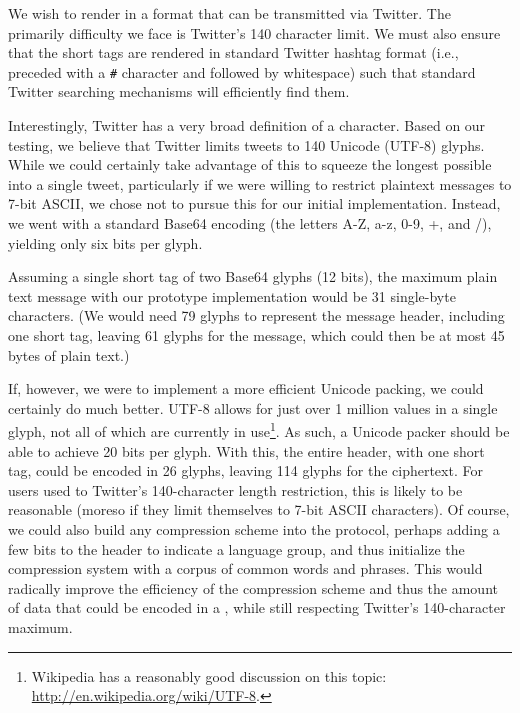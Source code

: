 
We wish to render \msgs in a format that can be transmitted via
Twitter. The primarily difficulty we face is Twitter's 140 character
limit. We must also ensure that the short tags are rendered in standard
Twitter hashtag format (i.e., preceded with a {\tt \#} character and
followed by whitespace) such that standard Twitter searching mechanisms
will efficiently find them.

Interestingly, Twitter has a very broad definition of a character. Based
on our testing, we believe that Twitter limits tweets to 140 Unicode
(UTF-8) glyphs. While we could certainly take advantage of this to
squeeze the longest possible \msgs into a single tweet, particularly if
we were willing to restrict plaintext messages to 7-bit ASCII, we chose
not to pursue this for our initial implementation. Instead, we went with
a standard Base64 encoding (the letters A-Z, a-z, 0-9, +, and /),
yielding only six bits per glyph.

Assuming a single short tag of two Base64 glyphs (12 bits), the maximum
plain text message with our prototype implementation would be 31
single-byte characters. (We would need 79 glyphs to represent the
message header, including one short tag, leaving 61 glyphs for the
message, which could then be at most 45 bytes of plain text.)

If, however, we were to implement a more efficient Unicode packing, we
could certainly do much better. UTF-8 allows for just over 1 million
values in a single glyph, not all of which are currently in use\footnote{Wikipedia has a
  reasonably good discussion on this topic:
  \url{http://en.wikipedia.org/wiki/UTF-8}.}. As such, a Unicode packer
should be able to achieve 20 bits per glyph. With this, the entire \hoot
header, with one short tag, could be encoded in 26 glyphs, leaving 114
glyphs for the ciphertext. For users used to Twitter's 140-character
length restriction,
this is likely to be reasonable (moreso if they limit themselves to
7-bit ASCII characters). Of course, we could also build any
compression scheme into the \hoot protocol, perhaps adding a 
few bits to the header to indicate a language group, and thus
initialize the compression system with a corpus of common words
and phrases. This would radically improve the efficiency of the
compression scheme and thus the amount of data that could be encoded
in a \hoot, while still respecting Twitter's 140-character maximum.

